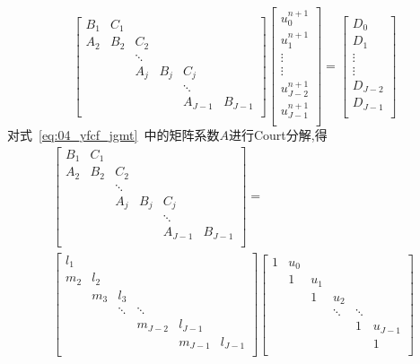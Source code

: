 \begin{equation}~\label{eq:04_yfcf_jgmt}
\begin{bmatrix}
   B_1 & C_1 \\
   A_2 & B_2 & C_2 \\
       &  & \ddots    &  \\
       &     & A_j &  B_j    & C_j          \\
       &     &        &  & \ddots     \\
       &     &        &        &   A_{J-1}   & B_{J-1}     \\
\end{bmatrix}
\begin{bmatrix}
u_0^{n+1} \\
u_1^{n+1} \\
\vdots    \\
\vdots    \\
u_{J-2}^{n+1} \\
u_{J-1}^{n+1} \\
\end{bmatrix}
=
\begin{bmatrix}
D_0 \\
D_1\\
\vdots    \\
\vdots    \\
D_{J-2} \\
D_{J-1} \\
\end{bmatrix}
\end{equation}
对式~\eqref{eq:04_yfcf_jgmt}~中的矩阵系数$A$进行Court分解,得
\begin{multline}
\begin{bmatrix}
   B_1 & C_1 \\
   A_2 & B_2 & C_2 \\
       &  & \ddots    &  \\
       &     & A_j &  B_j    & C_j          \\
       &     &        &  & \ddots     \\
       &     &        &        &   A_{J-1}   & B_{J-1}     \\
\end{bmatrix}=\\
\begin{bmatrix}
l_1 & \\
m_2 & l_2 \\
    & m_3 & l_3 \\
    &     & \ddots & \ddots & \\
    &     &        & m_{J-2} & l_{J-1} \\
    &	  &	   &	     &  m_{J-1} & l_{J-1} \\
\end{bmatrix}
\begin{bmatrix}
1 & u_0       \\
  &  1  & u_1 \\
  &     &   1  &  u_2 \\
  &     &      &   \ddots & \ddots \\
  &     &      &          &    1   & u_{J-1} \\
  &     &      &          &        &      1   \\
\end{bmatrix}
\end{multline}
